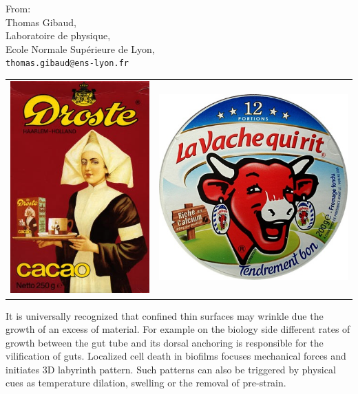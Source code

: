 \documentclass[a4paper, parskip=true, firsthead=false, fromemail=true, foldmarks=false]{scrlttr2}
\begin{document}
\begin{letter}{From:\\
Thomas Gibaud,\\
Laboratoire de physique,\\
Ecole Normale Supérieure de Lyon,\\
\texttt{thomas.gibaud@ens-lyon.fr}
}
\begin{tabu}{X[c]X[c]}
\includegraphics[height=8\baselineskip]{../Droste.jpg}&
\includegraphics[height=8\baselineskip]{../vachequirit.jpg}
\end{tabu}



It is universally recognized that confined thin surfaces may wrinkle due the growth of an excess of material. For example on the biology side different rates of growth between the gut tube and its dorsal anchoring is responsible for the vilification of guts. Localized cell death in biofilms focuses mechanical forces and initiates 3D labyrinth pattern. Such patterns can also be triggered by physical cues as temperature dilation, swelling or the removal of pre-strain.


\end{letter}
\end{document}
